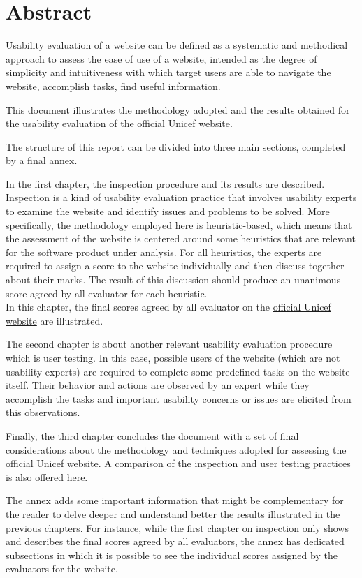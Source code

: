 
\section{Abstract}

Usability evaluation of a website can be defined as a systematic and methodical approach to assess the ease of use of a website, intended as the degree of simplicity and intuitiveness with which target users are able to navigate the website, accomplish tasks, find useful information.

This document illustrates the methodology adopted and the results obtained for the usability evaluation of the \href{https://www.unicef.org/}{official Unicef website}.

The structure of this report can be divided into three main sections, completed by a final annex.

In the first chapter, the inspection procedure and its results are described. Inspection is a kind of usability evaluation practice that involves usability experts to examine the website and identify issues and problems to be solved. More specifically, the methodology employed here is heuristic-based, which means that the assessment of the website is centered around some heuristics that are relevant for the software product under analysis. 
For all heuristics, the experts are required to assign a score to the website individually and then discuss together about their marks. The result of this discussion should produce an unanimous score agreed by all evaluator for each heuristic.\\
In this chapter, the final scores agreed by all evaluator on the \href{https://www.unicef.org/}{official Unicef website} are illustrated.

The second chapter is about another relevant usability evaluation procedure which is user testing. In this case, possible users of the website (which are not usability experts) are required to complete some predefined tasks on the website itself. Their behavior and actions are observed by an expert while they accomplish the tasks and important usability concerns or issues are elicited from this observations.

Finally, the third chapter concludes the document with a set of final considerations about the methodology and techniques adopted for assessing the \href{https://www.unicef.org/}{official Unicef website}. A comparison of the inspection and user testing practices is also offered here.

The annex adds some important information that might be complementary for the reader to delve deeper and understand better the results illustrated in the previous chapters. For instance, while the first chapter on inspection only shows and describes the final scores agreed by all evaluators, the annex has dedicated subsections in which it is possible to see the individual scores assigned by the evaluators for the website.
